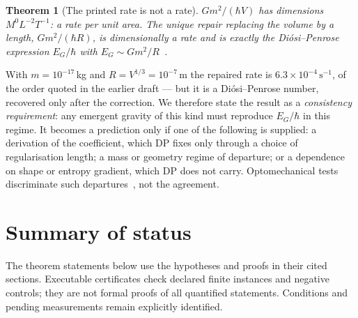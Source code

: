 \documentclass[aps,prd,twocolumn,superscriptaddress,nofootinbib]{revtex4-2}
\newtheorem{theorem}{Theorem}
\begin{document}
\begin{theorem}[The printed rate is not a rate]\label{thm:H}
$Gm^2/(\hbar V)$ has dimensions $M^0L^{-2}T^{-1}$: a rate per unit area. The
unique repair replacing the volume by a length, $Gm^2/(\hbar R)$, is
dimensionally a rate and is exactly the Di\'osi--Penrose expression
$E_G/\hbar$ with $E_G\sim Gm^2/R$~\cite{Diosi1987,Penrose1996}.
\end{theorem}

With $m=10^{-17}$\,kg and $R=V^{1/3}=10^{-7}$\,m the repaired rate is
$6.3\times10^{-4}\,\mathrm{s^{-1}}$, of the order quoted in the earlier draft ---
but it is a Di\'osi--Penrose number, recovered only after the correction. We
therefore state the result as a \emph{consistency requirement}: any emergent
gravity of this kind must reproduce $E_G/\hbar$ in this regime. It becomes a
prediction only if one of the following is supplied: a derivation of the
coefficient, which DP fixes only through a choice of regularisation length; a
mass or geometry regime of departure; or a dependence on shape or entropy
gradient, which DP does not carry. Optomechanical tests discriminate such
departures~\cite{Aspelmeyer2014,Bassi2013}, not the agreement.

\section{Summary of status}\label{sec:summary}

The theorem statements below use the hypotheses and proofs in their cited
sections. Executable certificates check declared finite instances and negative
controls; they are not formal proofs of all quantified statements. Conditions
and pending measurements remain explicitly identified.
\end{document}
